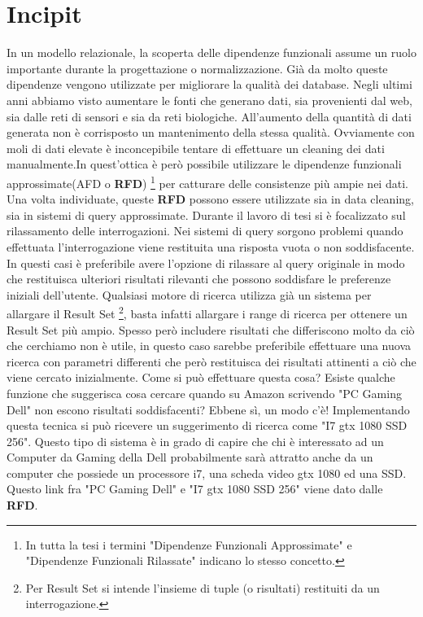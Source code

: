 \section{Incipit}

In un modello relazionale, la scoperta delle dipendenze funzionali assume un ruolo importante durante la progettazione o normalizzazione. Già da molto queste dipendenze vengono utilizzate per migliorare la qualità dei database.
Negli ultimi anni abbiamo visto aumentare le fonti che generano dati, sia provenienti dal web, sia dalle reti di sensori e sia da reti biologiche. All’aumento della quantità di dati generata non è corrisposto un mantenimento della stessa qualità. Ovviamente con moli di dati elevate è inconcepibile tentare di effettuare un cleaning dei dati manualmente.In quest’ottica è però possibile utilizzare le dipendenze funzionali approssimate(AFD o \textbf{RFD}) \footnote{In tutta la tesi i termini "Dipendenze Funzionali Approssimate" e "Dipendenze Funzionali Rilassate" indicano lo stesso concetto.} per catturare delle consistenze più ampie nei dati.
Una volta individuate, queste \textbf{RFD} possono essere utilizzate sia in data cleaning, sia in sistemi di query approssimate. Durante il lavoro di tesi si è focalizzato sul rilassamento delle interrogazioni. Nei sistemi di query sorgono problemi quando effettuata l'interrogazione viene restituita una risposta vuota o non soddisfacente. In questi casi è preferibile avere l'opzione di rilassare al query originale in modo che restituisca ulteriori risultati rilevanti che possono soddisfare le preferenze iniziali dell'utente. Qualsiasi motore di ricerca utilizza già un sistema per allargare il Result Set \footnote{Per Result Set si intende l'insieme di tuple (o risultati) restituiti da un interrogazione.}, basta infatti allargare i range di ricerca per ottenere un Result Set più ampio. Spesso però includere risultati che differiscono molto da ciò che cerchiamo non è utile, in questo caso sarebbe preferibile effettuare una nuova ricerca con parametri differenti che però restituisca dei risultati attinenti a ciò che viene cercato inizialmente. Come si può effettuare questa cosa? Esiste qualche funzione che suggerisca cosa cercare quando su Amazon scrivendo "PC Gaming Dell" non escono risultati soddisfacenti? Ebbene sì, un modo c'è! Implementando questa tecnica si può ricevere un suggerimento di ricerca come "I7 gtx 1080 SSD 256". Questo tipo di sistema è in grado di capire che chi è interessato ad un Computer da Gaming della Dell probabilmente sarà attratto anche da un computer che possiede un processore i7, una scheda video gtx 1080 ed una SSD.
Questo link fra "PC Gaming Dell" e "I7 gtx 1080 SSD 256" viene dato dalle \textbf{RFD}.

